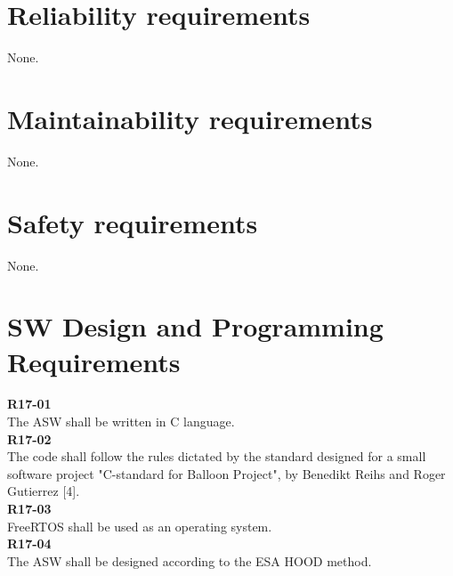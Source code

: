 \section{Reliability requirements}
None.

\section{Maintainability requirements}
None.

\section{Safety requirements}
None.

\section {SW Design and Programming Requirements}

\textbf{R17-01}\\
The ASW shall be written in C language.\\

\textbf{R17-02}\\
The code shall follow the rules dictated by the standard designed for a small software project "C-standard for Balloon Project", by Benedikt Reihs and Roger Gutierrez [4].\\

\textbf{R17-03}\\
FreeRTOS shall be used as an operating system.\\

\textbf{R17-04}\\
The ASW shall be designed according to the ESA HOOD method.\\


